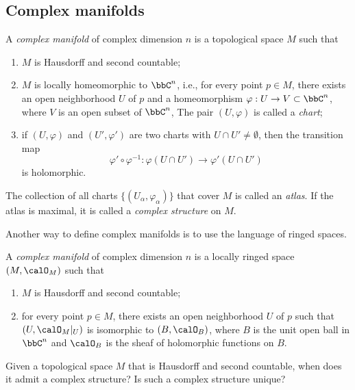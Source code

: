 
\subsection{Complex manifolds}

\begin{definition}\label{def:complex-manifold-by-altas}
	A \emph{complex manifold} of complex dimension \(n\) is a topological space \(M\) such that
	\begin{enumerate}
		\item \(M\) is Hausdorff and second countable;
		\item \(M\) is locally homeomorphic to \(\bbC^n\), i.e., for every point \(p\in M\), there exists an open neighborhood \(U\) of \(p\) and a homeomorphism \(\varphi: U\to V\subset \bbC^n\), where \(V\) is an open subset of \(\bbC^n\),
		      The pair \((U,\varphi)\) is called a \emph{chart};
		\item if \((U,\varphi)\) and \((U',\varphi')\) are two charts with \(U\cap U'\neq \emptyset\), then the transition map
		      \[
			      \varphi'\circ \varphi^{-1}: \varphi(U\cap U')\to \varphi'(U\cap U')
		      \]
		      is holomorphic.
	\end{enumerate}
	The collection of all charts \(\{(U_\alpha,\varphi_\alpha)\}\) that cover \(M\) is called an \emph{atlas}.
	If the atlas is maximal, it is called a \emph{complex structure} on \(M\).
\end{definition}

Another way to define complex manifolds is to use the language of ringed spaces.

\begin{definition}\label{def:complex-manifold-as-ringed-space}
	A \emph{complex manifold} of complex dimension \(n\) is a locally ringed space \((M,\calO_M)\) such that
	\begin{enumerate}
		\item \(M\) is Hausdorff and second countable;
		\item for every point \(p\in M\), there exists an open neighborhood \(U\) of \(p\) such that \((U,\calO_M|_U)\) is isomorphic to \((B,\calO_B)\), where \(B\) is the unit open ball in \(\bbC^n\) and \(\calO_B\) is the sheaf of holomorphic functions on \(B\).
	\end{enumerate}
\end{definition}

\begin{question}\label{qs:existence_and_uniqueness_of_complex_structure}
	Given a topological space \(M\) that is Hausdorff and second countable, when does it admit a complex structure?
	Is such a complex structure unique?
\end{question}

